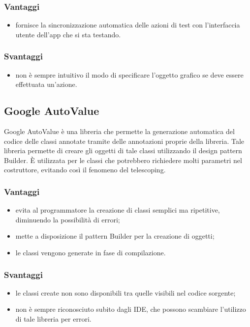 \documentclass[../Tesi.tex]{subfiles}
\begin{document}
		\subsubsection{Vantaggi}
			\begin{itemize}
				\item fornisce la sincronizzazione automatica delle azioni di test con l'interfaccia utente dell'app che si sta testando.
			\end{itemize}
		\subsubsection{Svantaggi}
			\begin{itemize}
				\item non è sempre intuitivo il modo di specificare l'oggetto grafico se deve essere effettuata un'azione.
			\end{itemize}
	\subsection{Google AutoValue}
		Google AutoValue è una libreria che permette la generazione automatica del codice delle classi annotate tramite delle annotazioni proprie della libreria. Tale libreria permette di creare gli oggetti di tale classi utilizzando il design pattern Builder. È utilizzata per le classi che potrebbero richiedere molti parametri nel costruttore, evitando così il fenomeno del telescoping. 
		\subsubsection{Vantaggi}
			\begin{itemize}	
				\item evita al programmatore la creazione di classi semplici ma ripetitive, diminuendo la possibilità di errori;
				\item mette a disposizione il pattern Builder per la creazione di oggetti;
				\item le classi vengono generate in fase di compilazione.
			\end{itemize}
		\subsubsection{Svantaggi}
			\begin{itemize}
				\item le classi create non sono disponibili tra quelle visibili nel codice sorgente;
				\item non è sempre riconosciuto subito dagli IDE, che possono scambiare l'utilizzo di tale libreria per errori.
			\end{itemize}
\end{document}
